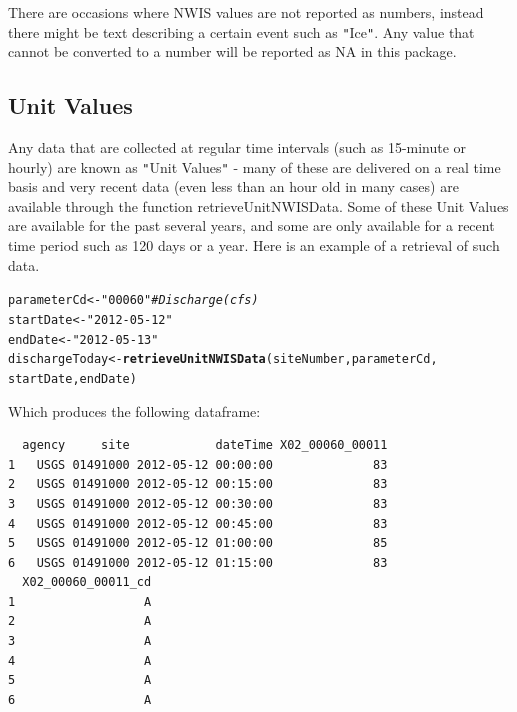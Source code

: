 \documentclass[a4paper,11pt]{article}\usepackage[]{graphicx}\usepackage[]{color}
\makeatletter
\newcommand{\hlstr}[1]{\textcolor[rgb]{0.192,0.494,0.8}{#1}}%
\newcommand{\hlcom}[1]{\textcolor[rgb]{0.678,0.584,0.686}{\textit{#1}}}%
\newcommand{\hlstd}[1]{\textcolor[rgb]{0.345,0.345,0.345}{#1}}%
\newcommand{\hlkwb}[1]{\textcolor[rgb]{0.69,0.353,0.396}{#1}}%
\newcommand{\hlkwd}[1]{\textcolor[rgb]{0.737,0.353,0.396}{\textbf{#1}}}%
\newenvironment{kframe}{%
 \def\at@end@of@kframe{}%
 \ifinner\ifhmode%
  \def\at@end@of@kframe{\end{minipage}}%
  \begin{minipage}{\columnwidth}%
 \fi\fi%
 \def\FrameCommand##1{\hskip\@totalleftmargin \hskip-\fboxsep
 \colorbox{shadecolor}{##1}\hskip-\fboxsep
     \hskip-\linewidth \hskip-\@totalleftmargin \hskip\columnwidth}%
 \MakeFramed {\advance\hsize-\width
   \@totalleftmargin\z@ \linewidth\hsize
   \@setminipage}}%
 {\par\unskip\endMakeFramed%
 \at@end@of@kframe}
\newenvironment{knitrout}{}{} %
\makeatother
\begin{document}
\begin{knitrout}
\end{knitrout}



There are occasions where NWIS values are not reported as numbers, instead there might be text describing a certain event such as \texttt{"}Ice\texttt{"}.  Any value that cannot be converted to a number will be reported as NA in this package.

\FloatBarrier

\subsection{Unit Values}
\label{sec:usgsRT}
Any data that are collected at regular time intervals (such as 15-minute or hourly) are known as \texttt{"}Unit Values\texttt{"} - many of these are delivered on a real time basis and very recent data (even less than an hour old in many cases) are available through the function retrieveUnitNWISData.  Some of these Unit Values are available for the past several years, and some are only available for a recent time period such as 120 days or a year.  Here is an example of a retrieval of such data.  

\begin{knitrout}
\color{fgcolor}\begin{kframe}
\begin{alltt}
\hlstd{parameterCd} \hlkwb{<-} \hlstr{"00060"}  \hlcom{# Discharge (cfs)}
\hlstd{startDate} \hlkwb{<-} \hlstr{"2012-05-12"}
\hlstd{endDate} \hlkwb{<-} \hlstr{"2012-05-13"}
\hlstd{dischargeToday} \hlkwb{<-} \hlkwd{retrieveUnitNWISData}\hlstd{(siteNumber, parameterCd,}
        \hlstd{startDate, endDate)}
\end{alltt}
\end{kframe}
\end{knitrout}

Which produces the following dataframe:
\begin{knitrout}
\color{fgcolor}\begin{kframe}
\begin{verbatim}
  agency     site            dateTime X02_00060_00011
1   USGS 01491000 2012-05-12 00:00:00              83
2   USGS 01491000 2012-05-12 00:15:00              83
3   USGS 01491000 2012-05-12 00:30:00              83
4   USGS 01491000 2012-05-12 00:45:00              83
5   USGS 01491000 2012-05-12 01:00:00              85
6   USGS 01491000 2012-05-12 01:15:00              83
  X02_00060_00011_cd
1                  A
2                  A
3                  A
4                  A
5                  A
6                  A
\end{verbatim}
\end{kframe}
\end{knitrout}
\end{document}
